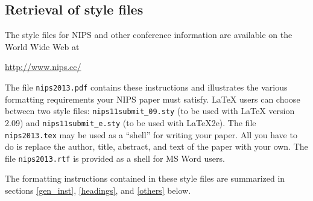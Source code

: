 \documentclass{article} %
\begin{document}




\subsection{Retrieval of style files}

The style files for NIPS and other conference information are available on the World Wide Web at
\begin{center}
   \url{http://www.nips.cc/}
\end{center}
The file \verb+nips2013.pdf+ contains these 
instructions and illustrates the
various formatting requirements your NIPS paper must satisfy. \LaTeX{}
users can choose between two style files:
\verb+nips11submit_09.sty+ (to be used with \LaTeX{} version 2.09) and
\verb+nips11submit_e.sty+ (to be used with \LaTeX{}2e). The file
\verb+nips2013.tex+ may be used as a ``shell'' for writing your paper. All you
have to do is replace the author, title, abstract, and text of the paper with
your own. The file
\verb+nips2013.rtf+ is provided as a shell for MS Word users.

The formatting instructions contained in these style files are summarized in
sections \ref{gen_inst}, \ref{headings}, and \ref{others} below.

\end{document}
